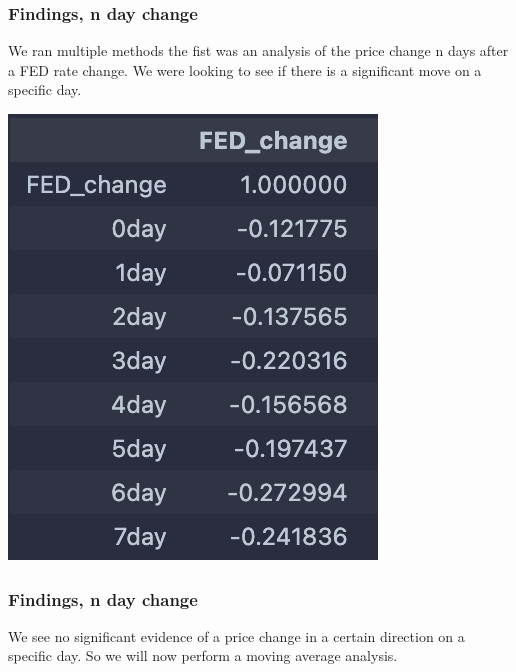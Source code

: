 \documentclass{beamer}
\begin{document}
\begin{frame}
    \frametitle{Findings, n day change}
We ran multiple methods the fist was an analysis of the price change n days after a FED rate change. We were looking to see if there is a significant move on a specific day. \\
\begin{center}
    \includegraphics{research_project/text/paper/1.png}
\end{center}


\end{frame}
\begin{frame}
    \frametitle{Findings, n day change}
We see no significant evidence of a price change in a certain direction on a specific day. So we will now perform a moving average analysis.
\end{frame}
\end{document}
